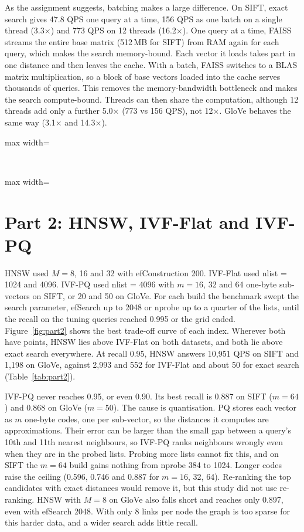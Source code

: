 \documentclass[10pt,a4paper]{article}
\newcommand{\tableinput}[1]{\begin{adjustbox}{max width=\linewidth}\small\setlength{\tabcolsep}{4.5pt}\end{adjustbox}}
\begin{document}
As the assignment suggests, batching makes a large difference. On SIFT, exact search gives 47.8 QPS one query at a time, 156 QPS as one batch on a single thread (3.3$\times$) and 773 QPS on 12 threads (16.2$\times$). One query at a time, FAISS streams the entire
base matrix (512\,MB for SIFT) from RAM again for each query, which makes the search memory-bound. Each vector it loads takes part in one distance and then leaves the cache. With a batch, FAISS switches to a BLAS matrix multiplication, so a block of base vectors loaded
into the cache serves thousands of queries. This removes the memory-bandwidth bottleneck and makes the search compute-bound. Threads
can then share the computation, although 12 threads add only a further 5.0$\times$ (773 vs 156 QPS), not 12$\times$. GloVe behaves
the same way (3.1$\times$ and 14.3$\times$).

\begin{table}[h]\centering
\tableinput{part1_agreement}\\[4pt]
\tableinput{part1_timing}
\caption{Exact search. The top table compares the exact top-10 with the stored neighbours. The bottom table gives the timings, with each speed-up relative to one query at a time on the same dataset.}
\end{table}

\section{Part 2: HNSW, IVF-Flat and IVF-PQ}
HNSW used $M = 8$, 16 and 32 with efConstruction 200. IVF-Flat used nlist = 1024 and 4096. IVF-PQ used nlist = 4096 with $m = 16$, 32 and 64 one-byte sub-vectors on SIFT, or 20 and 50 on GloVe. For each build the benchmark swept the
search parameter, efSearch up to 2048 or nprobe up to a quarter of the lists, until the recall on the tuning queries reached 0.995
or the grid ended. Figure~\ref{fig:part2} shows the best trade-off curve of each index. Wherever both have points, HNSW lies above
IVF-Flat on both datasets, and both lie above exact search everywhere. At recall 0.95, HNSW answers 10,951 QPS on SIFT and 1,198 on GloVe, against 2,993 and 552 for IVF-Flat and about 50 for exact search (Table~\ref{tab:part2}).

IVF-PQ never reaches 0.95, or even 0.90. Its best recall is 0.887 on SIFT ($m = 64$) and 0.868 on GloVe ($m = 50$). The cause is
quantisation. PQ stores each vector as $m$ one-byte codes, one per sub-vector, so the distances it computes are approximations.
Their error can be larger than the small gap between a query's 10th and 11th nearest neighbours, so IVF-PQ ranks neighbours wrongly
even when they are in the probed lists. Probing more lists cannot fix this, and on SIFT the $m = 64$ build gains nothing from
nprobe 384 to 1024. Longer codes raise the ceiling (0.596, 0.746 and 0.887 for $m = 16$, 32, 64). Re-ranking the top candidates
with exact distances would remove it, but this study did not use re-ranking. HNSW with $M = 8$ on GloVe also falls short and reaches only 0.897, even with efSearch 2048. With only 8 links per node the graph is too sparse for this harder data, and a wider search adds little recall.
\end{document}
